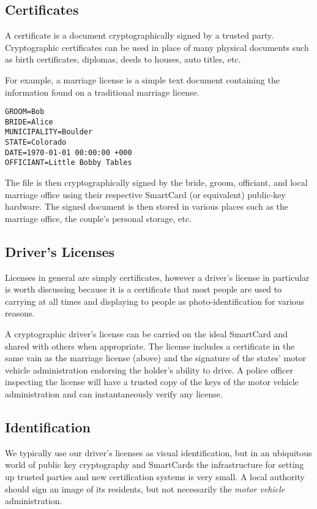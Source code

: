 \documentclass[11pt, twocolumn]{article}
\begin{document}
\subsection{Certificates}

A certificate is a document cryptographically signed by a trusted party.
Cryptographic certificates can be used in place of many physical documents such
as birth certificates, diplomas, deeds to houses, auto titles, etc.

For example, a marriage license is a simple text document containing the
information found on a traditional marriage license.

\begin{verbatim}
GROOM=Bob
BRIDE=Alice
MUNICIPALITY=Boulder
STATE=Colorado
DATE=1970-01-01 00:00:00 +000
OFFICIANT=Little Bobby Tables
\end{verbatim}

The file is then cryptographically signed by the bride, groom, officiant, and
local marriage office using their respective SmartCard (or equivalent)
public-key hardware. The signed document is then stored in various places such
as the marriage office, the couple's personal storage, etc.

\subsection{Driver's Licenses}

Licenses in general are simply certificates, however a driver's license
in particular is worth discussing because it is a certificate that most people
are used to carrying at all times and displaying to people as
photo-identification for various reasons.

A cryptographic driver's license can be carried on the ideal SmartCard and
shared with others when appropriate. The license includes a certificate in the
same vain as the marriage license (above) and the signature of the states' motor
vehicle administration endorsing the holder's ability to drive. A police officer
inspecting the license will have a trusted copy of the keys of the motor vehicle
administration and can instantaneously verify any license.

\subsection{Identification}

We typically use our driver's licenses as visual identification, but in an
ubiquitous world of public key cryptography and SmartCards the infrastructure
for setting up trusted parties and new certification systems is very small. A
local authority should sign an image of its residents, but not necessarily the
\textit{motor vehicle} administration.
\end{document}
